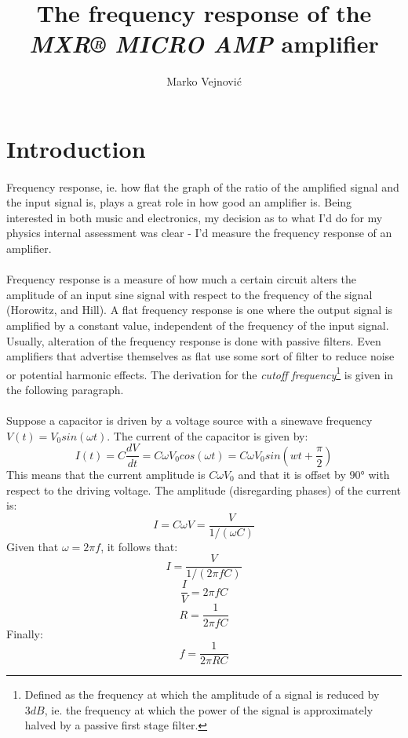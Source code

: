 \documentclass[a4paper, 12pt]{article}
\title{The frequency response of the \textit{MXR® MICRO AMP} amplifier}
\author{Marko Vejnovi\'{c}}
\begin{document}
\maketitle

\section{Introduction}
\paragraph*{}
Frequency response, ie. how flat the graph of the ratio of the amplified 
signal and the input signal is, plays a great role in how good an amplifier is. 
Being interested in both music and electronics, my decision as to what I'd do 
for my physics internal assessment was clear - I'd measure the frequency 
response of an amplifier.
\paragraph*{}
Frequency response is a measure of how much a certain circuit alters the 
amplitude of an input sine signal with respect to the frequency of the signal 
(Horowitz, and Hill). A flat frequency response is one where the output signal 
is amplified by a constant value, independent of the frequency of the input 
signal. Usually, alteration of the frequency response is done with passive 
filters. Even amplifiers that advertise themselves as flat use some sort of 
filter to reduce noise or potential harmonic effects. The derivation for 
the \textit{cutoff frequency}\footnote{Defined as the frequency at which the 
amplitude of a signal is reduced by $3\si{dB}$, ie. the frequency at which the 
power of the signal is approximately halved by a passive first stage filter.} 
is given in the following paragraph.

\paragraph*{} 
Suppose a capacitor is driven by a voltage source with a sinewave frequency 
$V(t) = V_0 sin(\omega t)$. The current of the capacitor is given by:
$$I(t) = C \frac{dV}{dt} = C \omega V_0 cos (\omega t) = 
C \omega V_0 sin(wt + \frac{\pi}{2})$$
This means that the current amplitude is $C \omega V_0$ and that it is offset 
by $\ang{90}$ with respect to the driving voltage. The amplitude (disregarding 
phases) of the current is:
$$I = C \omega V = \frac{V}{1 / (\omega C)}$$
Given that $\omega = 2 \pi f$, it follows that:
$$I = \frac{V}{1 /(2 \pi f C)}$$
$$\frac{I}{V} = 2 \pi f C$$
$$R = \frac{1}{2 \pi f C}$$
Finally:
\begin{equation} 
	f = \frac{1}{2 \pi R C}
	\label{eqn:cutoff-freq}
\end{equation}
\end{document}
